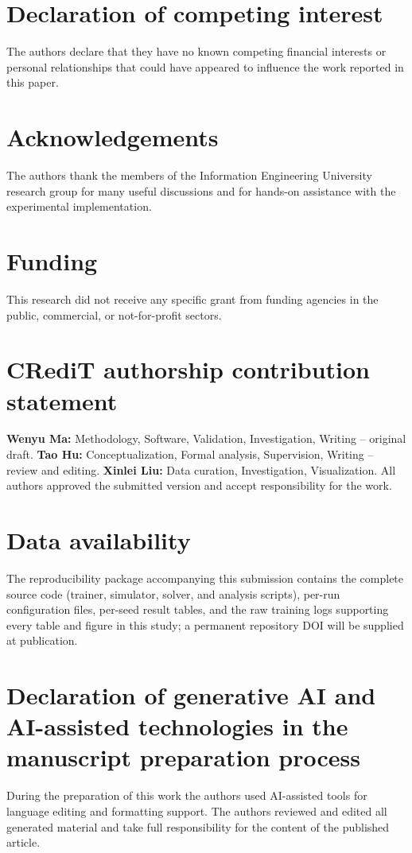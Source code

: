 \documentclass[preprint,12pt]{elsarticle}
\begin{document}
\section*{Declaration of competing interest}
The authors declare that they have no known competing financial interests or personal relationships that could have appeared to influence the work reported in this paper.

\section*{Acknowledgements}
The authors thank the members of the Information Engineering University research group for many useful discussions and for hands-on assistance with the experimental implementation.

\section*{Funding}
This research did not receive any specific grant from funding agencies in the public, commercial, or not-for-profit sectors.

\section*{CRediT authorship contribution statement}
\textbf{Wenyu Ma:} Methodology, Software, Validation, Investigation, Writing -- original draft.
\textbf{Tao Hu:} Conceptualization, Formal analysis, Supervision, Writing -- review and editing.
\textbf{Xinlei Liu:} Data curation, Investigation, Visualization.
All authors approved the submitted version and accept responsibility for the work.

\section*{Data availability}
The reproducibility package accompanying this submission contains the complete source code (trainer, simulator, solver, and analysis scripts), per-run configuration files, per-seed result tables, and the raw training logs supporting every table and figure in this study; a permanent repository DOI will be supplied at publication.

\section*{Declaration of generative AI and AI-assisted technologies in the manuscript preparation process}
During the preparation of this work the authors used AI-assisted tools for language editing and formatting support. The authors reviewed and edited all generated material and take full responsibility for the content of the published article.
\end{document}
